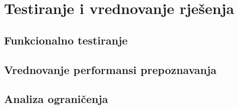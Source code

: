 \chapter{Testiranje i vrednovanje rješenja}

\section{Funkcionalno testiranje}

\section{Vrednovanje performansi prepoznavanja}

\section{Analiza ograničenja}